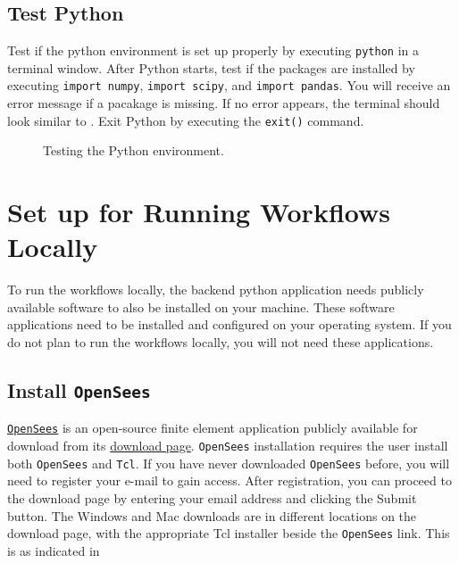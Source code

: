 \subsection{Test Python}

Test if the python environment is set up properly by
executing \texttt{python} in a terminal window. After Python starts,
test if the packages are installed by executing \texttt{import
numpy}, \texttt{import scipy}, and \texttt{import pandas}. You will
receive an error message if a pacakage is missing. If no error
appears, the terminal should look similar
to . Exit Python by executing
the \texttt{exit()} command.

\begin{figure}[!htbp]
  \caption{Testing the Python environment.}
  \label{fig:python_test}
\end{figure}

\section{Set up for Running Workflows Locally}\label{setup}

To run the workflows locally, the backend python application needs
publicly available software to also be installed on your
machine. These software applications need to be installed and
configured on your operating system. If you do not plan to run the
workflows locally, you will not need these applications.

\subsection{Install \texttt{OpenSees}}

\href{https://opensees.berkeley.edu}{\texttt{OpenSees}} is an open-source finite element application publicly available for download from its \href{https://opensees.berkeley.edu/OpenSees/user/download.php}{download page}. \texttt{OpenSees} installation requires the user install both \texttt{OpenSees} and \texttt{Tcl}.  If you have never downloaded \texttt{OpenSees} before, you will need to register your e-mail to gain access. After registration, you can proceed to the download page by entering your email address and clicking the Submit button. The Windows and Mac downloads are in different locations on the download page, with the appropriate Tcl installer beside the \texttt{OpenSees} link. This is as indicated in 

